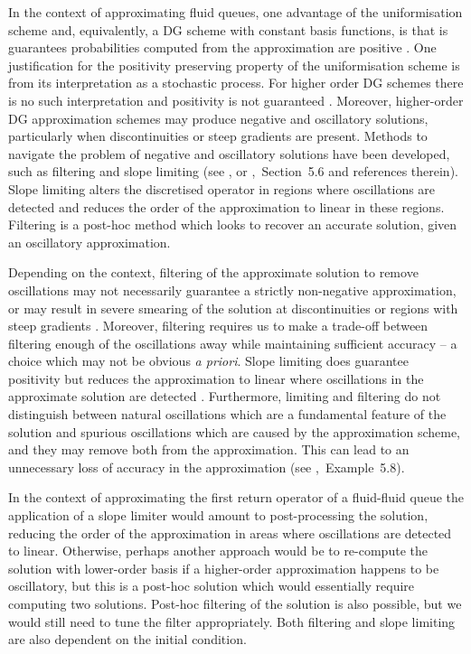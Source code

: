 In the context of approximating fluid queues, one advantage of the uniformisation scheme and, equivalently, a DG scheme with constant basis functions, is that is guarantees probabilities computed from the approximation are positive \citep[Section~3.3]{koltai2011}. One justification for the positivity preserving property of the uniformisation scheme is from its interpretation as a stochastic process. For higher order DG schemes there is no such interpretation and positivity is not guaranteed \citep[Section~3.3]{koltai2011}. Moreover, higher-order DG approximation schemes may produce negative and oscillatory solutions, particularly when discontinuities or steep gradients are present. Methods to navigate the problem of negative and oscillatory solutions have been developed, such as filtering and slope limiting (see \cite{c99}, or \cite{nodalDGBook},~Section~5.6 and references therein). Slope limiting alters the discretised operator in regions where oscillations are detected and reduces the order of the approximation to linear in these regions. Filtering is a post-hoc method which looks to recover an accurate solution, given an oscillatory approximation. 

Depending on the context, filtering of the approximate solution to remove oscillations may not necessarily guarantee a strictly non-negative approximation, or may result in severe smearing of the solution at discontinuities or regions with steep gradients \citep[Section~5.6.1]{nodalDGBook}. Moreover, filtering requires us to make a trade-off between filtering enough of the oscillations away while maintaining sufficient accuracy -- a choice which may not be obvious \emph{a priori}. Slope limiting does guarantee positivity but reduces the approximation to linear where oscillations in the approximate solution are detected \citep[Section~5.6.1]{nodalDGBook}. Furthermore, limiting and filtering do not distinguish between natural oscillations which are a fundamental feature of the solution and spurious oscillations which are caused by the approximation scheme, and they may remove both from the approximation. This can lead to an unnecessary loss of accuracy in the approximation (see \citep{nodalDGBook},~Example~5.8). 

In the context of approximating the first return operator of a fluid-fluid queue the application of a slope limiter would amount to post-processing the solution, reducing the order of the approximation in areas where oscillations are detected to linear. Otherwise, perhaps another approach would be to re-compute the solution with lower-order basis if a higher-order approximation happens to be oscillatory, but this is a post-hoc solution which would essentially require computing two solutions. Post-hoc filtering of the solution is also possible, but we would still need to tune the filter appropriately. Both filtering and slope limiting are also dependent on the initial condition. 

